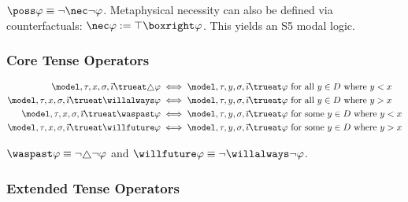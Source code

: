 \documentclass[../LogosReference.tex]{subfiles}
\begin{document}
\begin{remark}
	$\poss\metaA \equiv \neg\nec\neg\metaA$.
	Metaphysical necessity can also be defined via counterfactuals: $\nec\metaA := \top \boxright \metaA$.
	This yields an S5 modal logic.
\end{remark}

\subsubsection{Core Tense Operators}

\begin{definition}\label{def:tense-truth}
	\begin{align}
		\model, \history, x, \assignment, \tempindex \trueat \always\metaA     & \iff \model, \history, y, \assignment, \tempindex \trueat \metaA \text{ for all } y \in D \text{ where } y < x  \\
		\model, \history, x, \assignment, \tempindex \trueat \willalways\metaA & \iff \model, \history, y, \assignment, \tempindex \trueat \metaA \text{ for all } y \in D \text{ where } y > x  \\
		\model, \history, x, \assignment, \tempindex \trueat \waspast\metaA    & \iff \model, \history, y, \assignment, \tempindex \trueat \metaA \text{ for some } y \in D \text{ where } y < x \\
		\model, \history, x, \assignment, \tempindex \trueat \willfuture\metaA & \iff \model, \history, y, \assignment, \tempindex \trueat \metaA \text{ for some } y \in D \text{ where } y > x
	\end{align}
\end{definition}

\begin{remark}[Equivalences]
	$\waspast\metaA \equiv \neg\always\neg\metaA$ and $\willfuture\metaA \equiv \neg\willalways\neg\metaA$.
\end{remark}

\subsubsection{Extended Tense Operators}
\end{document}
